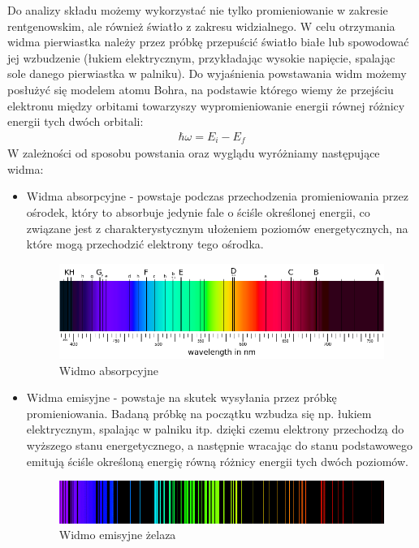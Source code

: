 \documentclass{article}
\begin{document}
\begin{enumerate}
Do analizy składu możemy wykorzystać nie tylko promieniowanie w zakresie rentgenowskim, ale również światło z zakresu widzialnego. W celu otrzymania widma pierwiastka należy przez próbkę przepuścić światło białe lub spowodować jej wzbudzenie (łukiem elektrycznym, przykładając wysokie napięcie, spalając sole danego pierwiastka w palniku). Do wyjaśnienia powstawania widm możemy posłużyć się modelem atomu Bohra, na podstawie którego wiemy  że przejściu elektronu między orbitami towarzyszy wypromieniowanie energii równej różnicy energii tych dwóch orbitali:
\begin{gather*}
\hbar\omega=E_i-E_f
\end{gather*}
W zależności od sposobu powstania oraz wyglądu wyróżniamy następujące widma:
\begin{itemize}
\item Widma absorpcyjne - powstaje podczas przechodzenia promieniowania przez ośrodek, który to absorbuje jedynie  fale o ściśle określonej energii, co związane jest z charakterystycznym ułożeniem poziomów energetycznych, na które mogą  przechodzić elektrony tego ośrodka.

\begin{figure}[h!]
\centering
\includegraphics[scale=0.5]{absorpcja.png}
\caption{Widmo absorpcyjne}
\end{figure}

\item Widma emisyjne - powstaje na skutek wysyłania przez próbkę promieniowania. Badaną próbkę  na początku wzbudza się np. łukiem elektrycznym, spalając w palniku itp. dzięki czemu elektrony przechodzą do wyższego stanu energetycznego, a następnie wracając do stanu podstawowego emitują ściśle określoną energię równą różnicy energii tych dwóch poziomów.

\begin{figure}[h!]
\centering
\includegraphics[scale=0.5]{emisja.png}
\caption{Widmo emisyjne żelaza}
\end{figure}


\end{itemize}
\end{enumerate}
\end{document}
